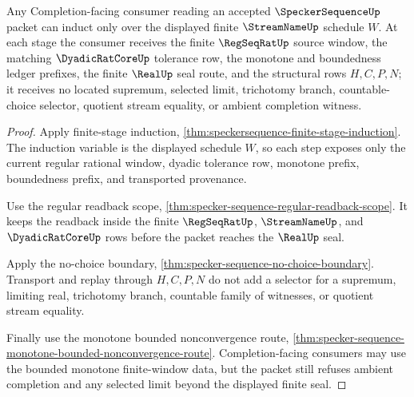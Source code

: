 \begin{theorem}
\label{thm:specker-sequence-completion-refusal-induction}
Any Completion-facing consumer reading an accepted $\SpeckerSequenceUp$ packet can induct only over the displayed finite $\StreamNameUp$ schedule $W$. At each stage the consumer receives the finite $\RegSeqRatUp$ source window, the matching $\DyadicRatCoreUp$ tolerance row, the monotone and boundedness ledger prefixes, the finite $\RealUp$ seal route, and the structural rows $H,C,P,N$; it receives no located supremum, selected limit, trichotomy branch, countable-choice selector, quotient stream equality, or ambient completion witness.
\end{theorem}
\begin{proof}
Apply finite-stage induction, \autoref{thm:speckersequence-finite-stage-induction}. The induction variable is the displayed schedule $W$, so each step exposes only the current regular rational window, dyadic tolerance row, monotone prefix, boundedness prefix, and transported provenance.

Use the regular readback scope, \autoref{thm:specker-sequence-regular-readback-scope}. It keeps the readback inside the finite $\RegSeqRatUp$, $\StreamNameUp$, and $\DyadicRatCoreUp$ rows before the packet reaches the $\RealUp$ seal.

Apply the no-choice boundary, \autoref{thm:specker-sequence-no-choice-boundary}. Transport and replay through $H,C,P,N$ do not add a selector for a supremum, limiting real, trichotomy branch, countable family of witnesses, or quotient stream equality.

Finally use the monotone bounded nonconvergence route, \autoref{thm:specker-sequence-monotone-bounded-nonconvergence-route}. Completion-facing consumers may use the bounded monotone finite-window data, but the packet still refuses ambient completion and any selected limit beyond the displayed finite seal.
\end{proof}

